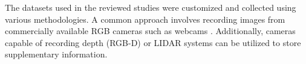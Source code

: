\documentclass[lettersize,journal]{IEEEtran}
\begin{document}

The datasets used in the reviewed studies were customized and collected using various methodologies. A common approach involves recording images from commercially available RGB cameras such as webcams \cite{chen2019sitting, menanno2024ergonomic}. Additionally, cameras capable of recording depth (RGB-D) \cite{rodrigues2022ergonomic} or LIDAR systems \cite{guduru2022prediction} can be utilized to store supplementary information.

\end{document}
